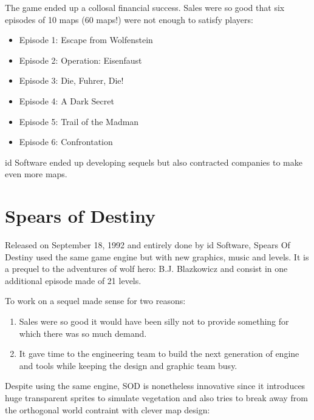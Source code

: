 \documentclass[book.tex]{subfiles}
\begin{document}
The game ended up a collosal financial success. Sales were so good that six episodes of 10 maps (60 maps!) were not enough to satisfy players:\\
\par
\begin{itemize}
\item Episode 1: Escape from Wolfenstein
\item Episode 2: Operation: Eisenfaust
\item Episode 3: Die, Fuhrer, Die!
\item Episode 4: A Dark Secret
\item Episode 5: Trail of the Madman
\item Episode 6: Confrontation
\end{itemize}
id Software ended up developing sequels but also contracted companies to make even more maps.

\section{Spears of Destiny}
Released on September 18, 1992 and entirely done by id Software, Spears Of Destiny used the same game engine but with new graphics, music and levels. It is a prequel to the adventures of wolf hero: B.J. Blazkowicz and consist in one additional episode made of 21 levels.\\
   \par
\begin{figure}[H]
\centering
 \end{figure}
 \par
 To work on a sequel made sense for two reasons:
 \begin{enumerate}
 \item Sales were so good it would have been silly not to provide something for which there was so much demand.
 \item It gave time to the engineering team to build the next generation of engine and tools while keeping the design and graphic team busy.
 \end{enumerate}
Despite using the same engine, SOD is nonetheless innovative since it introduces huge transparent sprites to simulate vegetation and also tries to break away from the orthogonal world contraint with clever map design:
    \par
\begin{figure}[H]
\centering
 \end{figure}
 \par
\end{document}
